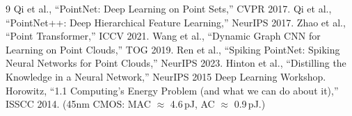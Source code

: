 \documentclass[11pt,a4paper]{article}
\begin{document}
\begin{thebibliography}{9}
 Qi et al., ``PointNet: Deep Learning on Point Sets,'' CVPR 2017.
 Qi et al., ``PointNet++: Deep Hierarchical Feature Learning,'' NeurIPS 2017.
 Zhao et al., ``Point Transformer,'' ICCV 2021.
 Wang et al., ``Dynamic Graph CNN for Learning on Point Clouds,'' TOG 2019.
 Ren et al., ``Spiking PointNet: Spiking Neural Networks for Point Clouds,'' NeurIPS 2023.
 Hinton et al., ``Distilling the Knowledge in a Neural Network,'' NeurIPS 2015 Deep Learning Workshop.
 Horowitz, ``1.1 Computing's Energy Problem (and what we can do about it),'' ISSCC 2014. (45nm CMOS: MAC $\approx$ 4.6\,pJ, AC $\approx$ 0.9\,pJ.)
\end{thebibliography}
\end{document}
